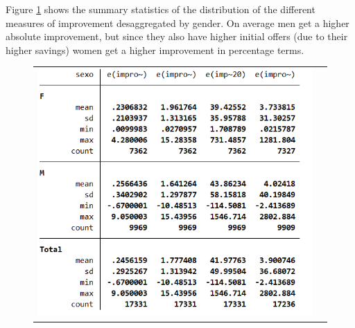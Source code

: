 \documentclass[12pt]{article}
\begin{document}
Figure \ref{fig:aux} shows the summary statistics of the distribution of the different measures of improvement desaggregated by gender. On average men get a higher absolute improvement, but since they also have higher initial offers (due to their higher savings) women get a higher improvement in percentage terms.
\begin{figure}[H]
\caption{}
\label{fig:aux}
\centering{}%
\begin{tabular}{cc}
\includegraphics[scale=0.7]{../Tables/IE3_offer_improvement_bygender.png}
\end{tabular}
\end{figure}
\end{document}
